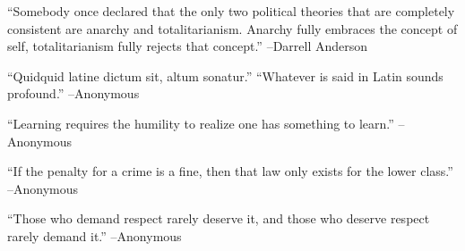 \documentclass{article}%
\begin{document}
\linebreak%
\vspace{1mm}%
\begin{minipage}{\textwidth}%
\flushleft%
“Somebody once declared that the only two political theories that are completely consistent are anarchy and totalitarianism. Anarchy fully embraces the concept of self, totalitarianism fully rejects that concept.”%
\linebreak%
\vspace{1mm}%
–Darrell Anderson%
\linebreak%
\vspace{1mm}%
\end{minipage}%
\linebreak%
\vspace{1mm}%
\begin{minipage}{\textwidth}%
\flushleft%
“Quidquid latine dictum sit, altum sonatur.”%
\linebreak%
\vspace{1mm}%
“Whatever is said in Latin sounds profound.”%
\linebreak%
–Anonymous%
\linebreak%
\vspace{1mm}%
\end{minipage}%
\linebreak%
\vspace{1mm}%
\begin{minipage}{\textwidth}%
\flushleft%
“Learning requires the humility to realize one has something to learn.”%
\linebreak%
\vspace{1mm}%
–Anonymous%
\linebreak%
\vspace{1mm}%
\end{minipage}%
\linebreak%
\vspace{1mm}%
\begin{minipage}{\textwidth}%
\flushleft%
“If the penalty for a crime is a fine, then that law only exists for the lower class.”%
\linebreak%
\vspace{1mm}%
–Anonymous%
\linebreak%
\vspace{1mm}%
\end{minipage}%
\linebreak%
\vspace{1mm}%
\begin{minipage}{\textwidth}%
\flushleft%
“Those who demand respect rarely deserve it, and those who deserve respect rarely demand it.”%
\linebreak%
\vspace{1mm}%
–Anonymous%
\linebreak%
\vspace{1mm}%
\end{minipage}%
\end{document}
